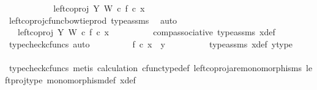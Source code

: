 \begin{isabellebody}
\ \ \ \ \ \ \isamarkupfalse%
\ \isamarkupfalse%
\ {\isachardoublequoteopen}{\isachardot}{\kern0pt}{\isachardot}{\kern0pt}{\isachardot}{\kern0pt}\ {\isacharequal}{\kern0pt}\ {\isacharparenleft}{\kern0pt}left{\isacharunderscore}{\kern0pt}coproj\ Y\ W\ {\isasymcirc}\isactrlsub c\ f{\isacharparenright}{\kern0pt}\ {\isasymcirc}\isactrlsub c\ x{\isachardoublequoteclose}\isanewline
\ \ \ \ \ \ \ \ \isamarkupfalse%
\ left{\isacharunderscore}{\kern0pt}coproj{\isacharunderscore}{\kern0pt}cfunc{\isacharunderscore}{\kern0pt}bowtie{\isacharunderscore}{\kern0pt}prod\ type{\isacharunderscore}{\kern0pt}assms\ \isamarkupfalse%
\ auto\isanewline
\ \ \ \ \ \ \isamarkupfalse%
\ \isamarkupfalse%
\ {\isachardoublequoteopen}{\isachardot}{\kern0pt}{\isachardot}{\kern0pt}{\isachardot}{\kern0pt}\ {\isacharequal}{\kern0pt}\ left{\isacharunderscore}{\kern0pt}coproj\ Y\ W\ {\isasymcirc}\isactrlsub c\ f\ {\isasymcirc}\isactrlsub c\ x{\isachardoublequoteclose}\isanewline
\ \ \ \ \ \ \ \ \isamarkupfalse%
\ comp{\isacharunderscore}{\kern0pt}associative{}\ type{\isacharunderscore}{\kern0pt}assms{\isacharparenleft}{\kern0pt}{}{\isacharparenright}{\kern0pt}\ x{\isacharunderscore}{\kern0pt}def\ \isamarkupfalse%
\ {\isacharparenleft}{\kern0pt}typecheck{\isacharunderscore}{\kern0pt}cfuncs{\isacharcomma}{\kern0pt}\ auto{\isacharparenright}{\kern0pt}\isanewline
\ \ \ \ \ \ \isamarkupfalse%
\ \isamarkupfalse%
\ {\isachardoublequoteopen}f\ {\isasymcirc}\isactrlsub c\ x\ {\isacharequal}{\kern0pt}\ y{\isachardoublequoteclose}\isanewline
\ \ \ \ \ \ \ \ \isamarkupfalse%
\ type{\isacharunderscore}{\kern0pt}assms{\isacharparenleft}{\kern0pt}{}{\isacharparenright}{\kern0pt}\ x{\isacharunderscore}{\kern0pt}def\ y{\isacharunderscore}{\kern0pt}type{}\ \ \isanewline
\ \ \ \ \ \ \ \ \isamarkupfalse%
\ {\isacharparenleft}{\kern0pt}typecheck{\isacharunderscore}{\kern0pt}cfuncs{\isacharcomma}{\kern0pt}\ metis\ calculation\ cfunc{\isacharunderscore}{\kern0pt}type{\isacharunderscore}{\kern0pt}def\ left{\isacharunderscore}{\kern0pt}coproj{\isacharunderscore}{\kern0pt}are{\isacharunderscore}{\kern0pt}monomorphisms\ left{\isacharunderscore}{\kern0pt}proj{\isacharunderscore}{\kern0pt}type\ monomorphism{\isacharunderscore}{\kern0pt}def\ x{\isacharunderscore}{\kern0pt}def{\isacharparenright}{\kern0pt}\isanewline
\ \ \ \ \isamarkupfalse%
\isanewline
\ \ \ \ \isamarkupfalse%

\end{isabellebody}
